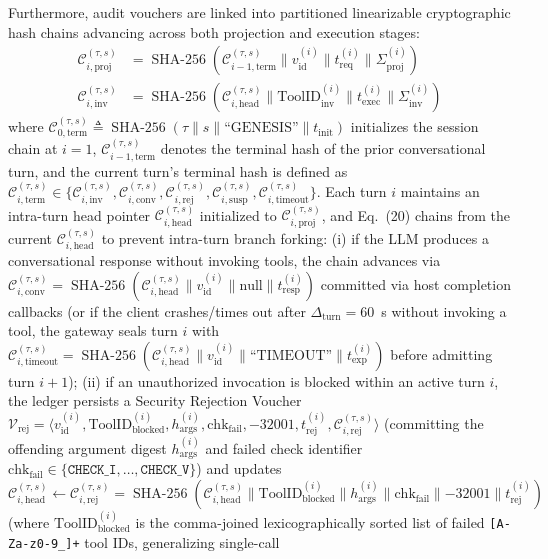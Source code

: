 \documentclass[conference,10pt]{IEEEtran}
\begin{document}
Furthermore, audit vouchers are linked into partitioned linearizable cryptographic hash chains advancing across both projection and execution stages:
\begin{align}
\mathcal{C}_{i,\text{proj}}^{(\tau, s)} &= \operatorname{SHA-256}\left(\mathcal{C}_{i-1,\text{term}}^{(\tau, s)} \parallel v_{\text{id}}^{(i)} \parallel t_{\text{req}}^{(i)} \parallel \Sigma_{\text{proj}}^{(i)}\right) \\
\mathcal{C}_{i,\text{inv}}^{(\tau, s)} &= \operatorname{SHA-256}\left(\mathcal{C}_{i,\text{head}}^{(\tau, s)} \parallel \text{ToolID}_{\text{inv}}^{(i)} \parallel t_{\text{exec}}^{(i)} \parallel \Sigma_{\text{inv}}^{(i)}\right)
\end{align}
where $\mathcal{C}_{0,\text{term}}^{(\tau, s)} \triangleq \operatorname{SHA-256}(\tau \parallel s \parallel \text{``GENESIS''} \parallel t_{\text{init}})$ initializes the session chain at $i=1$, $\mathcal{C}_{i-1,\text{term}}^{(\tau, s)}$ denotes the terminal hash of the prior conversational turn, and the current turn's terminal hash is defined as $\mathcal{C}_{i,\text{term}}^{(\tau, s)} \in \{\mathcal{C}_{i,\text{inv}}^{(\tau, s)}, \mathcal{C}_{i,\text{conv}}^{(\tau, s)}, \mathcal{C}_{i,\text{rej}}^{(\tau, s)}, \mathcal{C}_{i,\text{susp}}^{(\tau, s)}, \mathcal{C}_{i,\text{timeout}}^{(\tau, s)}\}$. Each turn $i$ maintains an intra-turn head pointer $\mathcal{C}_{i,\text{head}}^{(\tau,s)}$ initialized to $\mathcal{C}_{i,\text{proj}}^{(\tau,s)}$, and Eq.~(20) chains from the current $\mathcal{C}_{i,\text{head}}^{(\tau,s)}$ to prevent intra-turn branch forking: (i) if the LLM produces a conversational response without invoking tools, the chain advances via $\mathcal{C}_{i,\text{conv}}^{(\tau, s)} = \operatorname{SHA-256}(\mathcal{C}_{i,\text{head}}^{(\tau, s)} \parallel v_{\text{id}}^{(i)} \parallel \text{null} \parallel t_{\text{resp}}^{(i)})$ committed via host completion callbacks (or if the client crashes/times out after $\Delta_{\text{turn}} = 60$~s without invoking a tool, the gateway seals turn $i$ with $\mathcal{C}_{i,\text{timeout}}^{(\tau, s)} = \operatorname{SHA-256}(\mathcal{C}_{i,\text{head}}^{(\tau, s)} \parallel v_{\text{id}}^{(i)} \parallel \text{``TIMEOUT''} \parallel t_{\text{exp}}^{(i)})$ before admitting turn $i+1$); (ii) if an unauthorized invocation is blocked within an active turn $i$, the ledger persists a Security Rejection Voucher $\mathcal{V}_{\text{rej}} = \langle v_{\text{id}}^{(i)}, \text{ToolID}_{\text{blocked}}^{(i)}, h_{\text{args}}^{(i)}, \text{chk}_{\text{fail}}, -32001, t_{\text{rej}}^{(i)}, \mathcal{C}_{i,\text{rej}}^{(\tau,s)} \rangle$ (committing the offending argument digest $h_{\text{args}}^{(i)}$ and failed check identifier $\text{chk}_{\text{fail}} \in \{\texttt{CHECK\_I}, \dots, \texttt{CHECK\_V}\}$) and updates $\mathcal{C}_{i,\text{head}}^{(\tau, s)} \leftarrow \mathcal{C}_{i,\text{rej}}^{(\tau, s)} = \operatorname{SHA-256}(\mathcal{C}_{i,\text{head}}^{(\tau, s)} \parallel \text{ToolID}_{\text{blocked}}^{(i)} \parallel h_{\text{args}}^{(i)} \parallel \text{chk}_{\text{fail}} \parallel -32001 \parallel t_{\text{rej}}^{(i)})$ (where $\text{ToolID}_{\text{blocked}}^{(i)}$ is the comma-joined lexicographically sorted list of failed \texttt{[A-Za-z0-9\_]+} tool IDs, generalizing single-call 
\end{document}
